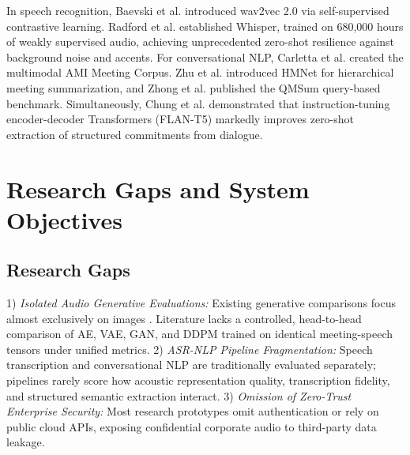 \documentclass[conference]{IEEEtran}
\begin{document}
In speech recognition, Baevski et al. \cite{baevski2020wav2vec} introduced wav2vec 2.0 via self-supervised contrastive learning. Radford et al. \cite{radford2023whisper} established Whisper, trained on 680,000 hours of weakly supervised audio, achieving unprecedented zero-shot resilience against background noise and accents. For conversational NLP, Carletta et al. \cite{carletta2005ami} created the multimodal AMI Meeting Corpus. Zhu et al. \cite{zhu2020hmnet} introduced HMNet for hierarchical meeting summarization, and Zhong et al. \cite{zhong2021qmsum} published the QMSum query-based benchmark. Simultaneously, Chung et al. \cite{chung2024flan} demonstrated that instruction-tuning encoder-decoder Transformers (FLAN-T5) markedly improves zero-shot extraction of structured commitments from dialogue.

\section{Research Gaps and System Objectives}
\label{sec:research_gaps}

\subsection{Research Gaps}
1) \textit{Isolated Audio Generative Evaluations:} Existing generative comparisons focus almost exclusively on images \cite{mane2026colorization, kharkate2026skin, mane2026deepfake}. Literature lacks a controlled, head-to-head comparison of AE, VAE, GAN, and DDPM trained on identical meeting-speech tensors under unified metrics.
2) \textit{ASR-NLP Pipeline Fragmentation:} Speech transcription and conversational NLP are traditionally evaluated separately; pipelines rarely score how acoustic representation quality, transcription fidelity, and structured semantic extraction interact.
3) \textit{Omission of Zero-Trust Enterprise Security:} Most research prototypes omit authentication or rely on public cloud APIs, exposing confidential corporate audio to third-party data leakage.
\end{document}
